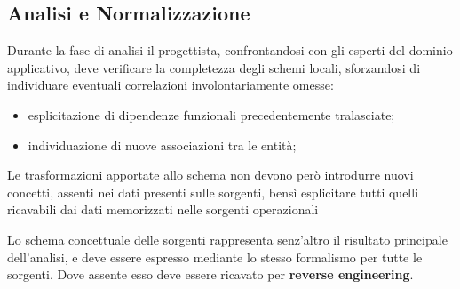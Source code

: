 \subsection{Analisi e Normalizzazione}\label{sub:db_analisi_e_normalizzazione} %
Durante la fase di analisi il progettista, confrontandosi con gli esperti del dominio applicativo, deve verificare la completezza degli schemi locali, sforzandosi di individuare eventuali correlazioni involontariamente omesse:
\begin{itemize}
    \item esplicitazione di dipendenze funzionali precedentemente tralasciate;
    \item individuazione di nuove associazioni tra le entità;
\end{itemize}
\begin{warning}
    Le trasformazioni apportate allo schema non devono però introdurre nuovi concetti, assenti nei dati presenti sulle sorgenti, bensì esplicitare tutti quelli ricavabili dai dati memorizzati nelle sorgenti operazionali
\end{warning}
Lo schema concettuale delle sorgenti rappresenta senz'altro il risultato principale dell'analisi, e deve essere espresso mediante lo stesso formalismo per tutte le sorgenti.
Dove assente esso deve essere ricavato per \textbf{reverse engineering}.
%
